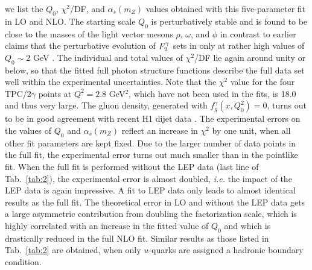 \documentclass[aps,prl,twocolumn,groupedaddress]{revtex4}
\begin{document}
%
we list the $Q_0$, $\chi^2$/DF, and $\alpha_s(m_Z)$ values obtained with this
five-parameter fit in LO and NLO. The starting scale $Q_0$
is perturbatively stable and is found to be close to the masses of the light
vector mesons $\rho$, $\omega$, and $\phi$ in contrast to earlier claims that
the perturbative evolution of $\f2y$ sets in only at rather high values of
$Q_0\sim 2$ GeV \cite{Gordon:1994mu}. The individual and total values of
$\chi^2$/DF lie again around unity or below, so that the fitted full photon
structure functions describe the full data set well within the experimental
uncertainties. Note that the $\chi^2$ value for the four TPC/2$\gamma$ points
at $Q^2=2.8$
GeV$^2$, which have not been used in the fits, is 18.0
and thus very large. The gluon density, generated with $f_g^\gamma(x,Q_0^2)=0$,
turns out to be in good agreement with recent
H1 dijet data \cite{Adloff:2000bs}. The experimental errors on
the values of $Q_0$ and $\alpha_s(m_Z)$ reflect an increase in $\chi^2$ by one
unit, when all other fit parameters are kept fixed. Due to the larger number
of data points in the full fit, the experimental error turns out
much smaller than in the pointlike fit. When the full fit is performed without
the LEP data (last line of Tab.\ \ref{tab:2}), the experimental error is
almost doubled, {\it i.e.} the impact of the LEP data is again impressive.
A fit to LEP data only leads to almost identical results as the full fit.
The theoretical error in LO and without the LEP data gets a large asymmetric
contribution from doubling the factorization scale, which is highly
correlated with an increase in the fitted value of $Q_0$ and which is
drastically reduced in the full NLO fit. Similar
results as those listed in Tab.\ \ref{tab:2} are obtained, when only $u$-quarks
are assigned a hadronic boundary condition.
\end{document}
